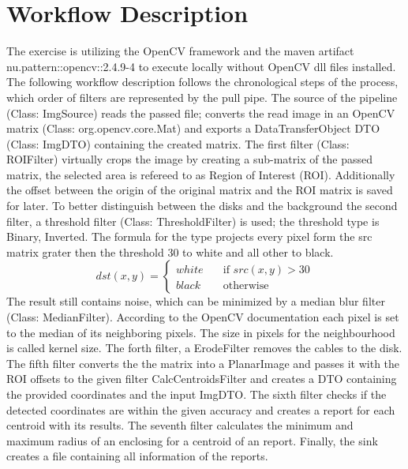\documentclass[a4paper, 11pt]{scrreprt}
\begin{document}
\chapter{Workflow Description}
The exercise is utilizing the OpenCV framework \parencite{intel_opencv_2019} and the maven artifact nu.pattern::opencv::2.4.9-4 to execute locally without OpenCV dll files installed.
The following workflow description follows the chronological steps of the process, which order of filters are represented by the pull pipe.
The source of the pipeline (Class: ImgSource) reads the passed file; converts the read image in an OpenCV matrix (Class: org.opencv.core.Mat) and exports a DataTransferObject DTO (Class: ImgDTO) containing the created matrix.
The first filter (Class: ROIFilter) virtually crops the image by creating a sub-matrix of the passed matrix, the selected area is refereed to as Region of Interest (ROI). Additionally the offset between the origin of the original matrix and the ROI matrix is saved for later.
To better distinguish between the disks and the background the second filter, a threshold filter (Class: ThresholdFilter) is used; the threshold type is Binary, Inverted.
The formula for the type \parencite{opencv_2.4.13.7_documentation_basic_nodate} projects every pixel form the src matrix grater then the threshold 30 to white and all other to black.
\[ dst(x, y) =
\begin{cases}
white       & \quad \text{if } src(x,y) > 30\\
black  & \quad \text{otherwise}
\end{cases}
\]
The result still contains noise, which can be minimized by a median blur filter (Class: MedianFilter). According to the OpenCV documentation \parencite{opencv_3.4.8_documentation_opencv:_nodate} each pixel is set to the median of its neighboring pixels.
The size in pixels for the neighbourhood is called kernel size.
The forth filter, a ErodeFilter removes the cables to the disk.
The fifth filter converts the the matrix into a PlanarImage and passes it with the ROI offsets to the given filter CalcCentroidsFilter and creates a DTO containing the provided coordinates and the input ImgDTO\@.
The sixth filter checks if the detected coordinates are within the given accuracy and creates a report for each centroid with its results.
The seventh filter calculates the minimum and maximum radius of an enclosing for a centroid of an report.
Finally, the sink creates a file containing all information of the reports.
\printbibliography
\end{document}
